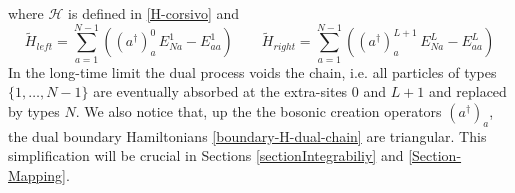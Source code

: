 \documentclass[10pt]{article}
\numberwithin{equation}{section}
\numberwithin{equation}{subsection}
\begin{document}
where $\mathcal{H}$ is defined in \eqref{H-corsivo} and 
\begin{equation}\label{boundary-H-dual-chain}
	\widetilde{H}_{left}=\sum_{a=1}^{N-1}\left((a^{\dagger})_{a}^{0}\,E_{Na}^{1}-E_{aa}^{1}\right)\qquad 	\widetilde{H}_{right}=\sum_{a=1}^{N-1}\left((a^{\dagger})_{a}^{L+1}\,E_{Na}^{L}-E_{aa}^{L}\right)
\end{equation}
In the long-time limit the dual process voids the chain, i.e. all particles of types $\{1,\ldots,N-1\}$ are eventually absorbed at the extra-sites $0$ and $L+1$ and replaced by types $N$. We also notice that, up the the bosonic creation operators $(a^{\dagger})_{a}$, the dual boundary Hamiltonians \eqref{boundary-H-dual-chain} are triangular. This simplification will be crucial in Sections \ref{sectionIntegrabiliy} and \ref{Section-Mapping}.\\
\end{document}
